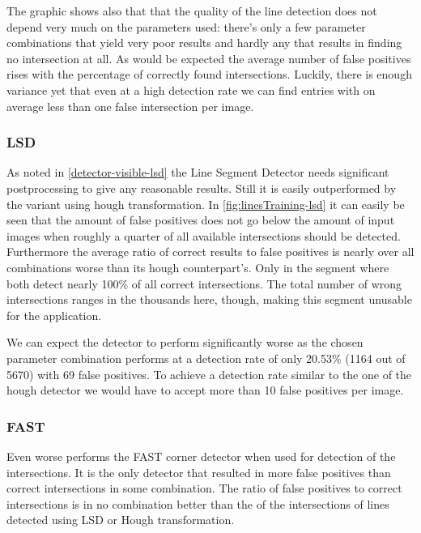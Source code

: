 	The graphic shows also that that the quality of the line detection does not depend very much on the parameters used: there's only a few parameter combinations that yield very poor results and hardly any that results in finding no intersection at all. As would be expected the average number of false positives rises with the percentage of correctly found intersections. Luckily, there is enough variance yet that even at a high detection rate we can find entries with on average less than one false intersection per image.

	\subsubsection{LSD}
	\label{evaluation-visible-optimization-lsd}
	As noted in \autoref{detector-visible-lsd} the Line Segment Detector needs significant postprocessing to give any reasonable results. Still it is easily outperformed by the variant using hough transformation. In \autoref{fig:linesTraining-lsd} it can easily be seen that the amount of false positives does not go below the amount of input images when roughly a quarter of all available intersections should be detected. Furthermore the average ratio of correct results to false positives is nearly over all combinations worse than its hough counterpart's. Only in the segment where both detect nearly 100\% of all correct intersections. The total number of wrong intersections ranges in the thousands here, though, making this segment unusable for the application.

	We can expect the detector to perform significantly worse as the chosen parameter combination performs at a detection rate of only 20.53\% (1164 out of 5670) with 69 false positives. To achieve a detection rate similar to the one of the hough detector we would have to accept more than 10 false positives per image.

	\subsubsection{FAST}
	\label{evaluation-visible-optimization-fast}
	Even worse performs the FAST corner detector when used for detection of the intersections. It is the only detector that resulted in more false positives than correct intersections in some combination. The ratio of false positives to correct intersections is in no combination better than the of the intersections of lines detected using LSD or Hough transformation.

